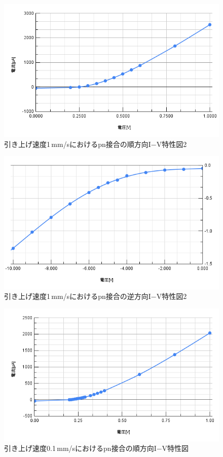 \documentclass[11pt]{jarticle}
\begin{document}
	\begin{figure}[H]
	\centering
	\includegraphics[width = 12cm]{figs/chart2.png}
	\caption{引き上げ速度1\,mm/sにおけるpn接合の順方向I−V特性図2}
	\label{fig:pnjun2}
	\end{figure}

	\begin{figure}[H]
	\centering
	\includegraphics[width = 12cm]{figs/chart5.png}
	\caption{引き上げ速度1\,mm/sにおけるpn接合の逆方向I−V特性図2}
	\label{fig:pngyaku2}
	\end{figure}

	\begin{figure}[H]
	\centering
	\includegraphics[width = 12cm]{figs/chart3.png}
	\caption{引き上げ速度0.1\,mm/sにおけるpn接合の順方向I−V特性図}
	\label{fig:pnjun0.1}
	\end{figure}
\end{document}

